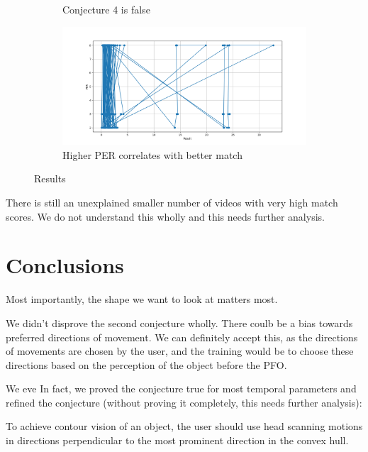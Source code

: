 \documentclass[]{article}
\begin{document}
\begin{figure}[h]
\begin{subfigure}{0.45\textwidth}
		\caption{Conjecture 4 is false}
		\label{graphs:conj4}
	\end{subfigure}
	\hfill
	\begin{subfigure}{0.45\textwidth}
		\centering
		\includegraphics[width=\textwidth]{QueryPER.png}
		\caption{Higher PER correlates with better match}
		\label{graphs:PER}
	\end{subfigure}
	\caption{Results}
	\label{fig:results_graphs}
\end{figure}
There is still an unexplained smaller number of videos with very high match scores. We do not understand this wholly and this needs further analysis. 
\section{Conclusions}
Most importantly, the shape we want to look at matters most. 

We didn't disprove the second conjecture wholly. There coulb be a bias towards preferred directions of movement. We can definitely accept this, as the directions of movements are chosen by the user, and the training would be to choose these directions based on the perception of the object before the PFO.

We eve
In fact, we proved the conjecture true for most temporal parameters and refined the conjecture (without proving it completely, this needs further analysis):

\begin{conjecture}
To achieve contour vision of an object, the user should use head scanning motions in directions perpendicular to the most prominent direction in the convex hull.
\end{conjecture}



\end{document}

